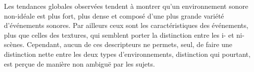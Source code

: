 Les tendances globales observées tendent à montrer qu'un environnement sonore non-idéale est plus fort, plus dense et composé d'une plus grande variété d'événements sonores. Par ailleurs ceux sont les caractéristiques des événements, plus que celles des textures, qui semblent porter la distinction entre les i- et ni-scènes. Cependant, aucun de ces descripteurs ne permets, seul, de faire une distinction nette entre les deux types d'environnements, distinction qui pourtant, est perçue de manière non ambiguë par les sujets. 

\begin{figure}[t]
        \myfloatalign
        \par

\end{figure}
